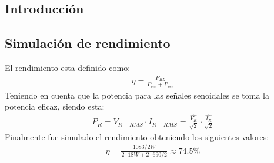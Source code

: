 
\subsection{Introducción}

\subsection{Simulación de  rendimiento}
El rendimiento esta definido como:
\begin{align}
\eta = \frac{P_{RL}}{P_{vcc}+P_{vee}}
\end{align}
Teniendo en cuenta que la potencia para las señales senoidales se toma la potencia eficaz, siendo esta:
\begin{align}
P_{R}=V_{R-RMS}\cdot I_{R-RMS} =\frac{\hat{V_{R}}}{\sqrt{2}} \cdot \frac{\hat{I_{R}}}{\sqrt{2}}
\end{align}
Finalmente fue simulado el rendimiento obteniendo los siguientes valores:
\begin{align}
\eta=\frac{1083 / 2 W}{ 2\cdot 18 W + 2 \cdot 690 /2}\approx 74.5 \%
\end{align}
